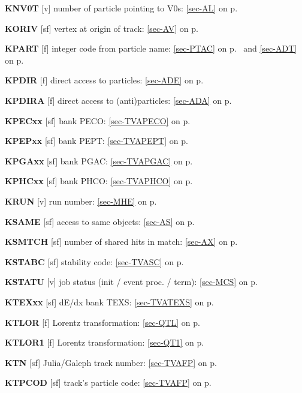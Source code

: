  \item{\bf KNV0T   }[v] number of particle pointing to V0s: \ref{sec-AL} on p.~\pageref{sec-AL}
 
 \item{\bf KORIV   }[sf] vertex at origin of track: \ref{sec-AV} on p.~\pageref{sec-AV}
 
 \item{\bf KPART   }[f] integer code from particle name:
 \ref{sec-PTAC} on p.~\pageref{sec-PTAC} and \ref{sec-ADT} on p.~\pageref{sec-ADT}\\
 \item{\bf KPDIR   }[f] direct access to particles: \ref{sec-ADE} on p.~\pageref{sec-ADE}\\
 \item{\bf KPDIRA  }[f] direct access to (anti)particles: \ref{sec-ADA} on p.~\pageref{sec-ADA}\\
 \item{\bf KPECxx  }[sf] bank PECO: \ref{sec-TVAPECO} on p.~\pageref{sec-TVAPECO}\\
 \item{\bf KPEPxx  }[sf] bank PEPT: \ref{sec-TVAPEPT} on p.~\pageref{sec-TVAPEPT}\\
 \item{\bf KPGAxx  }[sf] bank PGAC: \ref{sec-TVAPGAC} on p.~\pageref{sec-TVAPGAC}\\
 \item{\bf KPHCxx  }[sf] bank PHCO: \ref{sec-TVAPHCO} on p.~\pageref{sec-TVAPHCO}
 
 \item{\bf KRUN    }[v] run number: \ref{sec-MHE} on p.~\pageref{sec-MHE}
 
 \item{\bf KSAME   }[sf] access to same objects: \ref{sec-AS} on p.~\pageref{sec-AS}\\
 \item{\bf KSMTCH  }[sf] number of shared hits in match: \ref{sec-AX} on p.~\pageref{sec-AX}\\
 \item{\bf KSTABC  }[sf] stability code: \ref{sec-TVASC} on p.~\pageref{sec-TVASC}\\
 \item{\bf KSTATU  }[v] job status (init / event proc. / term):
 \ref{sec-MCS} on p.~\pageref{sec-MCS}
 
 \item{\bf KTEXxx  }[sf] dE/dx bank TEXS: \ref{sec-TVATEXS} on p.~\pageref{sec-TVATEXS}\\
 \item{\bf KTLOR   }[f] Lorentz transformation: \ref{sec-QTL} on p.~\pageref{sec-QTL}\\
 \item{\bf KTLOR1  }[f] Lorentz transformation: \ref{sec-QT1} on p.~\pageref{sec-QT1}\\
 \item{\bf KTN     }[sf] Julia/Galeph track number: \ref{sec-TVAFP} on p.~\pageref{sec-TVAFP}\\
 \item{\bf KTPCOD  }[sf] track's particle code: \ref{sec-TVAFP} on p.~\pageref{sec-TVAFP}
 
